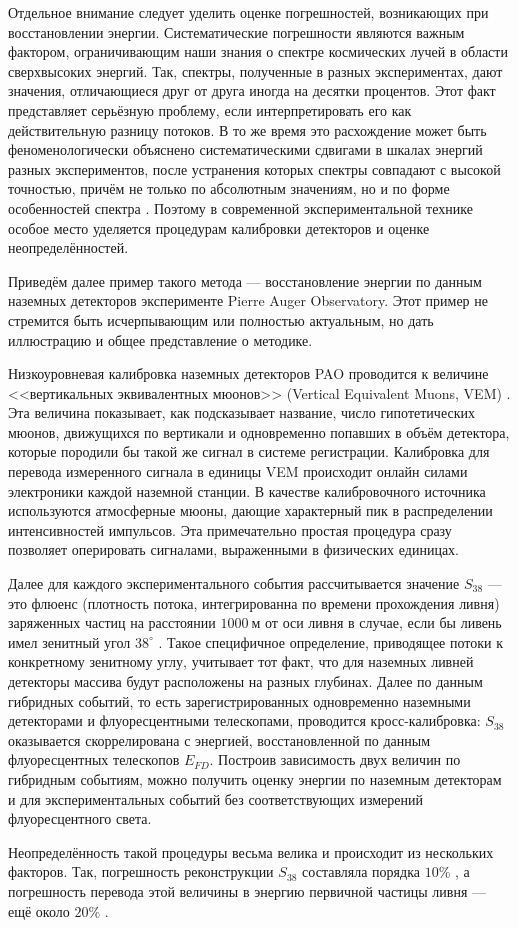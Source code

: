 Отдельное внимание следует уделить оценке погрешностей, возникающих при восстановлении энергии. Систематические погрешности являются важным фактором, ограничивающим наши знания о спектре космических лучей в области сверхвысоких энергий. Так, спектры, полученные в разных экспериментах, дают значения, отличающиеся друг от друга иногда на десятки процентов. Этот факт представляет серьёзную проблему, если интерпретировать его как действительную разницу потоков. В то же время это расхождение может быть феноменологически объяснено систематическими сдвигами в шкалах энергий разных экспериментов, после устранения которых спектры совпадают с высокой точностью, причём не только по абсолютным значениям, но и по форме особенностей спектра \cite{wg2013}. Поэтому в современной экспериментальной технике особое место уделяется процедурам калибровки детекторов и оценке неопределённостей.

Приведём далее пример такого метода --- восстановление энергии по данным наземных детекторов эксперименте Pierre Auger Observatory. Этот пример не стремится быть исчерпывающим или полностью актуальным, но дать иллюстрацию и общее представление о методике.

Низкоуровневая калибровка наземных детекторов PAO проводится к величине <<вертикальных эквивалентных мюонов>> (Vertical Equivalent Muons, VEM) \cite{Bertou2006}. Эта величина показывает, как подсказывает название, число гипотетических мюонов, движущихся по вертикали и одновременно попавших в объём детектора, которые породили бы такой же сигнал в системе регистрации. Калибровка для перевода измеренного сигнала в единицы VEM происходит онлайн силами электроники каждой наземной станции. В качестве калибровочного источника используются атмосферные мюоны, дающие характерный пик в распределении интенсивностей импульсов. Эта примечательно простая процедура сразу позволяет оперировать сигналами, выраженными в физических единицах.

Далее для каждого экспериментального события рассчитывается значение $S_{38}$ --- это флюенс (плотность потока, интегрированна по времени прохождения ливня) заряженных частиц на расстоянии $1000~\text{м}$ от оси ливня в случае, если бы ливень имел зенитный угол $38^{\circ}$ \cite{PAO-ICRC-2005}. Такое  специфичное определение, приводящее потоки к конкретному зенитному углу, учитывает тот факт, что для наземных ливней детекторы массива будут расположены на разных глубинах. Далее по данным гибридных событий, то есть зарегистрированных одновременно наземными детекторами и флуоресцентными телескопами, проводится кросс-калибровка: $S_{38}$ оказывается скоррелирована с энергией, восстановленной по данным флуоресцентных телескопов $E_{FD}$. Построив зависимость двух величин по гибридным событиям, можно получить оценку энергии по наземным детекторам и для экспериментальных событий без соответствующих измерений флуоресцентного света.

Неопределённость такой процедуры весьма велика и происходит из нескольких факторов. Так, погрешность реконструкции $S_{38}$ составляла порядка $10 \%$ \cite{Collaboration2005}, а погрешность перевода этой величины в энергию первичной частицы ливня --- ещё около $20 \%$ \cite{Roth2007}.
